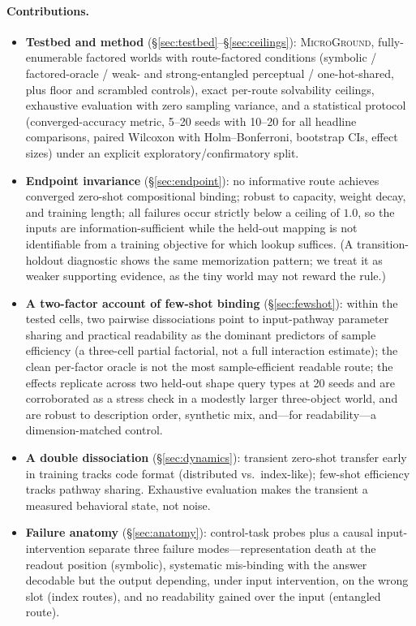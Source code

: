 \documentclass[10pt]{article} %
\newcommand{\microground}{\textsc{MicroGround}}
\begin{document}
\paragraph{Contributions.}
\begin{itemize}
\item \textbf{Testbed and method} (\S\ref{sec:testbed}--\S\ref{sec:ceilings}): \microground{},
fully-enumerable factored worlds with route-factored conditions (symbolic / factored-oracle /
weak- and strong-entangled perceptual / one-hot-shared, plus floor and scrambled controls), exact
per-route solvability ceilings, exhaustive evaluation with zero sampling variance, and a
statistical protocol (converged-accuracy metric, 5--20 seeds with 10--20 for all headline
comparisons, paired Wilcoxon with Holm--Bonferroni, bootstrap CIs, effect sizes) under an explicit
exploratory/confirmatory split.
\item \textbf{Endpoint invariance} (\S\ref{sec:endpoint}): no informative route achieves converged
zero-shot compositional binding; robust to capacity, weight decay, and training length; all failures
occur strictly below a ceiling of $1.0$, so the inputs are information-sufficient while the held-out
mapping is not identifiable from a training objective for which lookup suffices. (A transition-holdout
diagnostic shows the same memorization pattern; we treat it as weaker supporting evidence, as the
tiny world may not reward the rule.)
\item \textbf{A two-factor account of few-shot binding} (\S\ref{sec:fewshot}): within the tested
cells, two pairwise dissociations point to input-pathway parameter sharing and practical readability
as the dominant predictors of sample efficiency (a three-cell partial factorial, not a full
interaction estimate); the clean per-factor oracle is not the most sample-efficient readable route;
the effects replicate across two held-out shape query types at 20 seeds and are corroborated as a
stress check in a modestly larger three-object world, and are robust to description order, synthetic
mix, and---for readability---a dimension-matched control.
\item \textbf{A double dissociation} (\S\ref{sec:dynamics}): transient zero-shot transfer early in
training tracks code format (distributed vs.\ index-like); few-shot efficiency tracks pathway
sharing. Exhaustive evaluation makes the transient a measured behavioral state, not noise.
\item \textbf{Failure anatomy} (\S\ref{sec:anatomy}): control-task probes plus a causal
input-intervention separate three failure modes---representation death at the readout position
(symbolic), systematic mis-binding with the answer decodable but the output depending, under input
intervention, on the wrong slot (index routes), and no readability gained over the input (entangled route).
\end{itemize}
\end{document}
